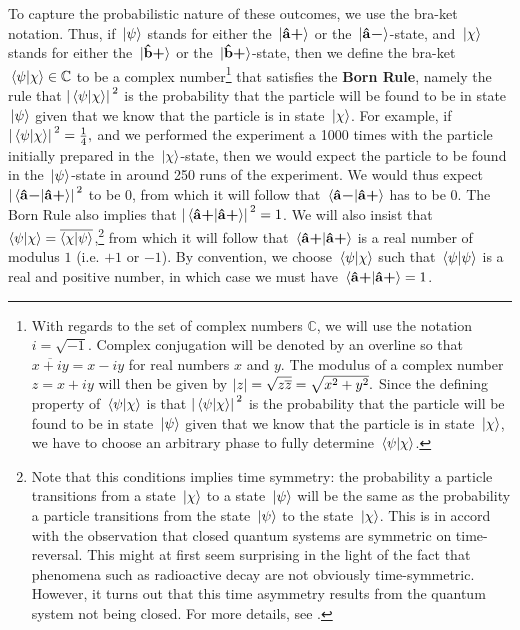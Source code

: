 To capture the probabilistic nature of these outcomes, we use the bra-ket notation. Thus, if $\ket*{\psi}$ stands for either the $\ket*{\vb{\hat{{a}}}\bm{+}}$ or the $\ket*{\vb{\hat{{a}}}\bm{-}}$-state, and $\ket*{\chi}$ stands for either the $\ket*{\vb{\hat{{b}}}\bm{+}}$ or the $\ket*{\vb{\hat{{b}}}\bm{+}}$-state, then we define the bra-ket $\ip*{\psi}{\chi}\in\mathbb{C}$ to be a complex number\footnote{With regards to the set of complex numbers $\mathbb{C}$, we will use the notation $i=\sqrt{-1}$. Complex conjugation will be denoted by an overline so that $\overline{x+iy}=x-iy$ for real numbers $x$ and $y$. The modulus of a complex number $z=x+iy$ will then be given by $\abs{z}=\sqrt{z\overline{z}}=\sqrt{x^2+y^2}.$ Since the defining property of  $\ip*{\psi}{\chi}$ is that $\abs*{\ip*{\psi}{\chi}}^2$ is the probability that the particle will be found to be in state $\ket*{\psi}$ given that we know that the particle is in state $\ket*{\chi}$, we have to choose an arbitrary phase to fully determine $\ip*{\psi}{\chi}$. } that satisfies the \textbf{Born Rule},\label{bornrule} namely the rule that $\abs*{\ip*{\psi}{\chi}}^2$ is the probability that the particle will be found to be in state $\ket*{\psi}$ given that we know that the particle is in state $\ket*{\chi}$. For example, if $\abs*{\ip*{\psi}{\chi}}^2=\frac{1}{4},$ and we performed the experiment a 1000 times with the particle initially prepared in the $\ket*{\chi}$-state, then we would expect the particle to be found in the $\ket*{\psi}$-state in around 250 runs of the experiment. We  would thus expect $\abs*{\ip*{\uvbm{a}}{\uvbp{a}}}^2$ to be $0$, from which it will follow that $\ip*{\uvbm{a}}{\uvbp{a}}$ has to be $0$. The Born Rule also implies that $\abs*{\ip*{\uvbp{a}}{\uvbp{a}}}^2=1$. We will also insist that $\ip{\psi}{\chi}=\overline{\ip{\chi}{\psi}}$,\footnote{Note that this conditions implies time symmetry: the probability a particle transitions from a state $\ket*{\chi}$ to a state $\ket*{\psi}$ will be the same as the probability a particle transitions from the state $\ket*{\psi}$ to the state $\ket*{\chi}$. This is in accord with the observation that closed quantum systems are symmetric on time-reversal. This might at first seem surprising in the light of the fact that phenomena such as radioactive decay are not obviously time-symmetric. However, it turns out that this time asymmetry results from the quantum system not being closed. For more details, see \cite{Pascazio2013}.}  from which it will follow that $\ip*{\uvbp{a}}{\uvbp{a}}$ is a real number of modulus $1$ (i.e. $+1$ or $-1$). By convention, we choose $\ip*{\psi}{\chi}$  such that $\ip*{\psi}{\psi}$ is a real and positive number, in which case we must have $\ip*{\uvbp{a}}{\uvbp{a}}=1$.
